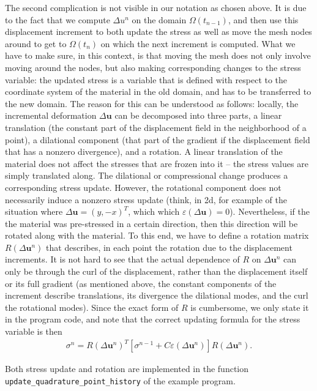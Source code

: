 \documentclass{article}
\renewcommand{\vec}[1]{\mathbf{#1}}
\begin{document}
The second complication is not visible in our notation as chosen above. It is
due to the fact that we compute $\Delta u^n$ on the domain $\Omega(t_{n-1})$,
and then use this displacement increment to both update the stress as well as
move the mesh nodes around to get to $\Omega(t_n)$ on which the next increment
is computed. What we have to make sure, in this context, is that moving the
mesh does not only involve moving around the nodes, but also making
corresponding changes to the stress variable: the updated stress is a variable
that is defined with respect to the coordinate system of the material in the
old domain, and has to be transferred to the new domain. The reason for this
can be understood as follows: locally, the incremental deformation $\Delta\vec
u$ can be decomposed into three parts, a linear translation (the constant part
of the displacement field in the neighborhood of a point), a dilational
component (that part of the gradient if the displacement field that has a
nonzero divergence), and a rotation. A linear translation of the material does
not affect the stresses that are frozen into it -- the stress values are
simply translated along. The dilational or compressional change produces a
corresponding stress update. However, the rotational component does not
necessarily induce a nonzero stress update (think, in 2d, for example of the
situation where $\Delta\vec u=(y, -x)^T$, which which $\varepsilon(\Delta \vec
u)=0$). Nevertheless, if the the material was pre-stressed in a certain
direction, then this direction will be rotated along with the material.  To
this end, we have to define a rotation matrix $R(\Delta \vec u^n)$ that
describes, in each point the rotation due to the displacement increments. It
is not hard to see that the actual dependence of $R$ on $\Delta \vec u^n$ can
only be through the curl of the displacement, rather than the displacement
itself or its full gradient (as mentioned above, the constant components of
the increment describe translations, its divergence the dilational modes, and
the curl the rotational modes). Since the exact form of $R$ is cumbersome, we
only state it in the program code, and note that the correct updating formula
for the stress variable is then
\begin{gather}
  \label{eq:stress-update+rot}
  \sigma^n
  = 
  R(\Delta \vec u^n)^T 
  [\sigma^{n-1} + C \varepsilon (\Delta \vec u^n)]
  R(\Delta \vec u^n).
\end{gather}

Both stress update and rotation are implemented in the function
\texttt{update\_\-quadrature\_\-point\_history} of the example program.
\end{document}
